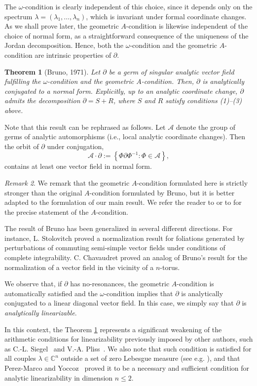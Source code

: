\documentclass[10pt,twoside,reqno]{amsart}
\newtheorem{thm}{Theorem}[section]
\theoremstyle{remark}
\theoremstyle{remark}
\newtheorem{remark}[thm]{Remark}
\begin{document}
The $\omega$-condition is clearly independent of this choice, since it depends only on the spectrum $\lambda=(\lambda_1,\ldots,\lambda_n)$, which is invariant under formal coordinate changes. As we shall prove later, the geometric $A$-condition is likewise independent of the choice of normal form, as a straightforward consequence of the uniqueness of the Jordan decomposition. Hence, both the $\omega$-condition and the geometric $A$-condition are intrinsic properties of $\partial$.
\begin{thm}[Bruno, 1971] \label{thm:Bruno-normalization}
    Let $\partial$ be a germ of singular analytic vector field fulfilling the $\omega$-condition and the geometric $A$-condition. Then, $\partial$ is analytically conjugated to a normal form. Explicitly, up to an analytic coordinate change, $\partial$ admits the decomposition $\partial = S + R$, where $S$ and $R$ satisfy conditions (1)–(3) above.
\end{thm}
Note that this result can be rephrased as follows. Let $\mathcal{A}$ denote the group of germs of analytic automorphisms (i.e., local analytic coordinate changes). Then the orbit of $\partial$ under conjugation,
\[
\mathcal{A}\cdot\partial
:=
\left\{
\Phi\partial\Phi^{-1}:\Phi\in\mathcal{A}
\right\},
\]
contains at least one vector field in normal form.
 \begin{remark}
We remark that the geometric $A$-condition formulated here is strictly stronger than the original $A$-condition formulated by Bruno, but it is better adapted to the formulation of our main result. We refer the reader to \cite{Bruno1971_1972} or to \cite[sec. 10.3]{Stolovitch2000} for the precise statement of the $A$-condition.
\end{remark}
The result of Bruno has been generalized in several different directions. For instance, L. Stolovitch proved a normalization result for foliations generated by perturbations of commuting semi-simple vector fields under conditions of complete integrability. C. Chavaudret \cite{Chavaudret2016} proved an analog of Bruno's result for the normalization of a vector field in the vicinity of a $n$-torus. 

We observe that, if $\partial$ has no-resonances, the geometric $A$-condition is automatically satisfied and the $\omega$-condition implies that $\partial$ is analytically conjugated to a linear diagonal vector field. In this case, we simply say that $\partial$ is {\em analytically linearizable}. 

In this context, the Theorem \ref{thm:Bruno-normalization}
represents a significant weakening of the arithmetic conditions for linearizability previously imposed by other authors, such as C.-L. Siegel~\cite{Siegel1954} and V.-A. Pliss~\cite{Pliss1965}.  We also note that such condition is satisfied for all couples $\lambda \in \mathbb{C}^n$ outside a set of zero Lebesgue measure (see e.g. \cite{AkramovRakhimov2025}),  and that Perez-Marco and Yoccoz~\cite{Perez-Marco-Yoccoz94}  proved it to be a necessary and sufficient condition for analytic linearizability in dimension $n\le 2$. 
\end{document}
